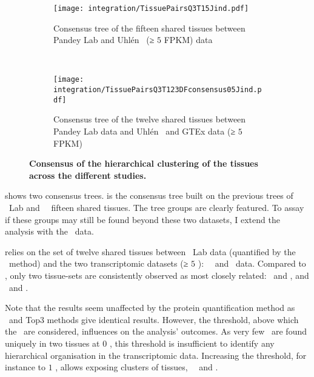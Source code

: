 \begin{figure}[!htp]
    \begin{subfigure}[t]{0.53\textwidth}
        \captionsetup{margin=0.6cm}
        \centering \texttt{[image: integration/TissuePairsQ3T15Jind.pdf]}
        \caption{Consensus tree of the fifteen shared tissues between Pandey Lab
        and Uhlén \etal\ (≥ $5$ FPKM) data}\label{fig:consensus2D15TQ3}
    \end{subfigure}~%
    \begin{subfigure}[t]{0.53\textwidth}
        \captionsetup{margin=0.6cm}
        \centering \texttt{[image: integration/TissuePairsQ3T123DFconsensus05Jind.pdf]}
        \caption{Consensus tree of the twelve shared tissues
        between Pandey Lab data and
        Uhlén \etal\ and GTEx data (≥ $5$ FPKM)}\label{fig:consensusTree05}
    \end{subfigure}
    \vspace{-3mm}
    \caption[Tissues hierachical clustering for Pandey Lab and Uhlén \etal\ data]{\label{fig:consensusTrees}%
    \textbf{Consensus of the hierarchical clustering of the tissues across the different studies.}
    }
\end{figure}

 shows two consensus trees.
 is the consensus tree built on
the previous trees of \pandey\ Lab and \uhlen\ \etal\ fifteen shared tissues.
The tree groups are clearly featured.
To assay if these groups may still be found beyond these two datasets,
I extend the analysis with the \gtex\ data.\mybr\

 relies on the set of twelve shared tissues between
\pandey\ Lab data (quantified by the \PPKM\ method)
and the two transcriptomic datasets (≥ $5$ \FPKM): \uhlen\ \etal\ and \gtex\ data.
Compared to ,
only two tissue-sets are consistently observed
as most closely related: \Liver\ and \Kidney, and \Testis\ and \Ovary.\mybr\

Note that the results seem unaffected by the protein quantification method
as \PPKM\ and Top3 methods give identical results.
However, the threshold,
above which the \mRNAs\ are considered,
influences on the analysis' outcomes.
As very few \mRNAs\ are found uniquely in two tissues at $0$ \FPKM,
this threshold is insufficient
to identify any hierarchical organisation in the transcriptomic data.
Increasing the threshold,
for instance to $1$ \FPKM,
allows exposing clusters of tissues, \eg\ \Liver\ and \Kidney{}.


